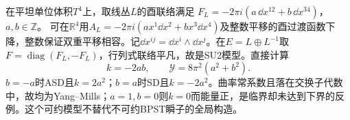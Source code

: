 在平坦单位体积$T^4$上，取线丛$L$的酉联络满足
$F_L=-2\pi i(a\,\dd x^{12}+b\,\dd x^{34})$，$a,b\in\mathbb Z$。
可在$\mathbb R^4$用$A_L=-2\pi i(ax^1\dd x^2+bx^3\dd x^4)$及整数平移的酉过渡函数下降，整数保证双重平移相容。记$\dd x^{ij}=\dd x^i\wedge\dd x^j$。在$E=L\oplus L^{-1}$取$F=\operatorname{diag}(F_L,-F_L)$，行列式联络平凡，故是SU2模型。直接计算
\[
 k=-2ab,\qquad \mathcal Y=8\pi^2(a^2+b^2).
\]
$b=-a$时ASD且$k=2a^2$；$b=a$时SD且$k=-2a^2$。曲率常系数且落在交换子代数中，故均为Yang--Mills；$a=1,b=0$则$k=0$而能量正，是临界却未达到下界的反例。这个可约模型不替代不可约BPST瞬子的全局构造。
